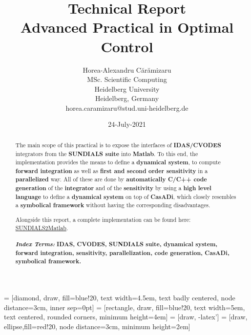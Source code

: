 \documentclass[12pt, letterpaper]{article}
\begin{document}
 = [diamond, draw, fill=blue!20, 
    text width=4.5em, text badly centered, node distance=3cm, inner sep=0pt]
 = [rectangle, draw, fill=blue!20, 
    text width=5em, text centered, rounded corners, minimum height=4em]
 = [draw, -latex']
 = [draw, ellipse,fill=red!20, node distance=3cm,
    minimum height=2em]


\title{Technical Report \\  Advanced Practical in Optimal Control }



\author{Horea-Alexandru C\u{a}r\u{a}mizaru \\
MSc. Scientific Computing\\
Heidelberg University \\
Heidelberg, Germany \\
horea.caramizaru@stud.uni-heidelberg.de
}
\date{24-July-2021}


\maketitle

\begin{abstract}

The main scope of this practical is to expose the interfaces of \textbf{IDAS/CVODES} integrators from the \textbf{SUNDIALS suite} \cite{hindmarsh2005sundials} into \textbf{Matlab}. To this end, the implementation provides the means to define a \textbf{dynamical system}, to compute \textbf{forward integration} as well as \textbf{first and second order sensitivity} in a \textbf{parallelized} way. All of these are done by \textbf{automatically C/C++ code generation} of the \textbf{integrator} and of the \textbf{sensitivity} by using a \textbf{high level language} to define a \textbf{dynamical system} on top of \textbf{CasADi}, which closely resembles a \textbf{symbolical framework} without having the corresponding disadvantages.

Alongside this report, a complete implementation can be found here: \href{https://github.com/nashmit/SUNDIALS2Matlab}{SUNDIALS2Matlab}.
\\
\\
\textbf{\textit{Index Terms:}} \textbf{IDAS, CVODES, SUNDIALS suite, dynamical system, forward integration, sensitivity, parallelization, code generation, CasADi, symbolical framework.}

\end{abstract}
\end{document}
